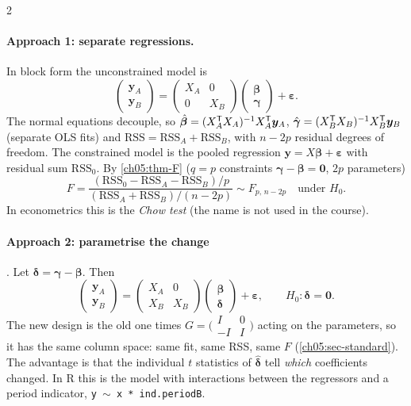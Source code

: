 \begin{paracol}{2}
\paragraph{Approach 1: separate regressions.} In block form the unconstrained model is
\[
  \begin{pmatrix}\bm y_A\\ \bm y_B\end{pmatrix}=\begin{pmatrix}X_A&0\\0&X_B\end{pmatrix}\begin{pmatrix}\bm\beta\\ \bm\gamma\end{pmatrix}+\bm\varepsilon .
\]
The normal equations decouple, so $\hat{\bm\beta}=(X_A^{\mathsf T} X_A)^{-1}X_A^{\mathsf T}\bm y_A$, $\hat{\bm\gamma}=(X_B^{\mathsf T} X_B)^{-1}X_B^{\mathsf T}\bm y_B$ (separate OLS fits)
and $\text{RSS}=\text{RSS}_A+\text{RSS}_B$, with $n-2p$ residual degrees of freedom. The constrained model is the pooled regression
$\bm y=X\bm\beta+\bm\varepsilon$ with residual sum $\text{RSS}_0$. By \cref{ch05:thm-F} ($q=p$ constraints $\bm\gamma-\bm\beta=\bm 0$, $2p$ parameters)
\begin{equation}\label{ch05:eq-chow}
  F=\frac{(\text{RSS}_0-\text{RSS}_A-\text{RSS}_B)/p}{(\text{RSS}_A+\text{RSS}_B)/(n-2p)}\sim F_{p,\,n-2p}\quad\text{under }H_0 .
\end{equation}
In econometrics this is the \emph{Chow test} (the name is not used in the course).

\paragraph{Approach 2: parametrise the change} . Let $\bm\delta=\bm\gamma-\bm\beta$. Then
\[
  \begin{pmatrix}\bm y_A\\ \bm y_B\end{pmatrix}=\begin{pmatrix}X_A&0\\X_B&X_B\end{pmatrix}\begin{pmatrix}\bm\beta\\ \bm\delta\end{pmatrix}+\bm\varepsilon,\qquad H_0:\bm\delta=\bm 0 .
\]
The new design is the old one times $G=\bigl(\begin{smallmatrix}I&0\\-I&I\end{smallmatrix}\bigr)$ acting on the parameters, so it has the
same column space: same fit, same RSS, same $F$ (\cref{ch05:sec-standard}). The advantage is that the individual
$t$ statistics of $\hat{\bm\delta}$ tell \emph{which} coefficients changed. In R this is the model with interactions
between the regressors and a period indicator, \texttt{y $\sim$ x * ind.periodB}.


\end{paracol}
